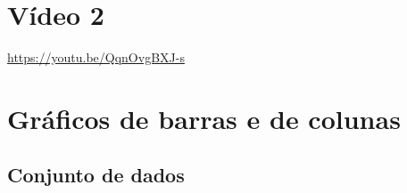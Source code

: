 \documentclass[
  11pt]{report}
\begin{document}
\hypertarget{vuxeddeo-2-2}{%
\section{Vídeo 2}\label{vuxeddeo-2-2}}

\begin{center} \url{https://youtu.be/QqnOvgBXJ-s} \end{center}

\hypertarget{gruxe1ficos-de-barras-e-de-colunas}{%
\section{Gráficos de barras e de colunas}\label{gruxe1ficos-de-barras-e-de-colunas}}

\hypertarget{conjunto-de-dados-1}{%
\subsection{Conjunto de dados}\label{conjunto-de-dados-1}}
\end{document}
